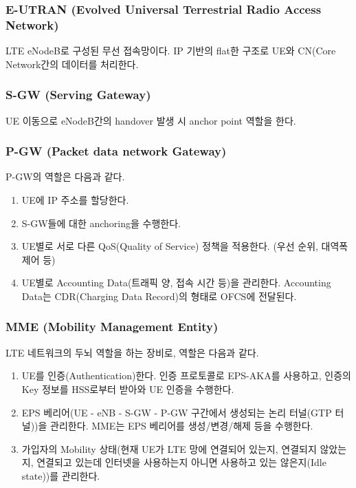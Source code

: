     \subsubsection*{E-UTRAN (Evolved Universal Terrestrial Radio Access Network)}
    LTE eNodeB로 구성된 무선 접속망이다. IP 기반의 flat한 구조로 UE와 CN(Core Network간의 데이터를 처리한다.
\vspace{-2mm}
    \subsubsection*{S-GW (Serving Gateway)}
    UE 이동으로 eNodeB간의 handover 발생 시 anchor point 역할을 한다.
\vspace{-2mm}
    \subsubsection*{P-GW (Packet data network Gateway)}
    P-GW의 역할은 다음과 같다.
    \begin{enumerate}
        \item UE에 IP 주소를 할당한다.    \vspace{-1mm}
        \item S-GW들에 대한 anchoring을 수행한다. \vspace{-1mm}
        \item UE별로 서로 다른 QoS(Quality of Service) 정책을 적용한다. (우선 순위, 대역폭 제어 등) \vspace{-1mm}
        \item UE별로 Accounting Data(트래픽 양, 접속 시간 등)을 관리한다. Accounting Data는 CDR(Charging Data Record)의 형태로 OFCS에 전달된다. \vspace{-1mm}
    \end{enumerate}
\vspace{-2mm}
    \subsubsection*{MME (Mobility Management Entity)}
    LTE 네트워크의 두뇌 역할을 하는 장비로, 역할은 다음과 같다.
    \begin{enumerate}
        \item UE를 인증(Authentication)한다. 인증 프로토콜로 EPS-AKA를 사용하고, 인증의 Key 정보를 HSS로부터 받아와 UE 인증을 수행한다.    \vspace{-1mm}
        \item EPS 베리어({UE - eNB - S-GW - P-GW} 구간에서 생성되는 논리 터널(GTP 터널))을 관리한다. MME는 EPS 베리어를 생성/변경/해제 등을 수행한다. \vspace{-1mm}
        \item 가입자의 Mobility 상태(현재 UE가 LTE 망에 연결되어 있는지, 연결되지 않았는지, 연결되고 있는데 인터넷을 사용하는지 아니면 사용하고 있는 않은지(Idle state))를 관리한다. \vspace{-1mm}
    \end{enumerate}
\vspace{-2mm}
